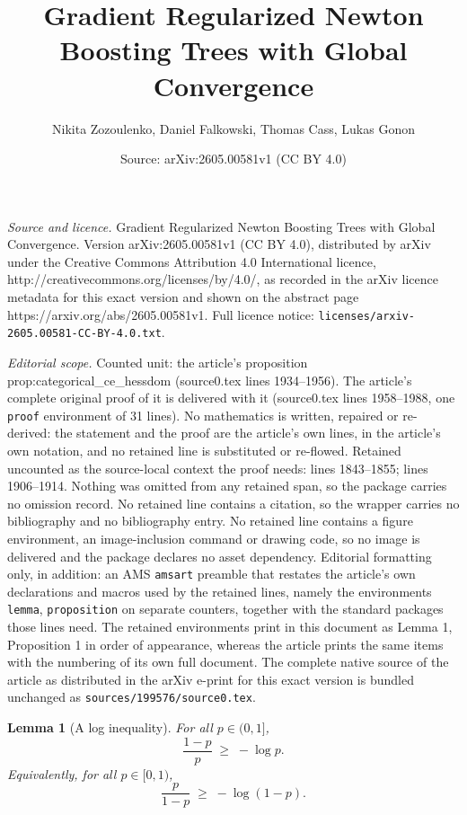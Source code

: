 \documentclass[10pt,a4paper]{amsart}
\title{Gradient Regularized Newton Boosting Trees with Global Convergence}
\author{Nikita Zozoulenko, Daniel Falkowski, Thomas Cass, Lukas Gonon}
\date{Source: arXiv:2605.00581v1 (CC BY 4.0)}
\newtheorem{lemma}{Lemma}
\begin{document}
\maketitle

\noindent\emph{Source and licence.} Gradient Regularized Newton Boosting Trees with Global Convergence. Version arXiv:2605.00581v1 (CC BY 4.0), distributed by arXiv under the Creative Commons Attribution 4.0 International licence, http://creativecommons.org/licenses/by/4.0/, as recorded in the arXiv licence metadata for this exact version and shown on the abstract page https://arxiv.org/abs/2605.00581v1. Full licence notice: \texttt{licenses/arxiv-2605.00581-CC-BY-4.0.txt}.\par\smallskip

\noindent\textit{Editorial scope.} Counted unit: the article's proposition prop:categorical\_ce\_hessdom (source0.tex lines 1934--1956). The article's complete original proof of it is delivered with it (source0.tex lines 1958--1988, one \texttt{proof} environment of 31 lines). No mathematics is written, repaired or re-derived: the statement and the proof are the article's own lines, in the article's own notation, and no retained line is substituted or re-flowed.  Retained uncounted as the source-local context the proof needs: lines 1843--1855; lines 1906--1914.  Nothing was omitted from any retained span, so the package carries no omission record.  No retained line contains a citation, so the wrapper carries no bibliography and no bibliography entry.  No retained line contains a figure environment, an image-inclusion command or drawing code, so no image is delivered and the package declares no asset dependency.  Editorial formatting only, in addition: an AMS \texttt{amsart} preamble that restates the article's own declarations and macros used by the retained lines, namely the environments \texttt{lemma}, \texttt{proposition} on separate counters, together with the standard packages those lines need.  The retained environments print in this document as Lemma 1, Proposition 1 in order of appearance, whereas the article prints the same items with the numbering of its own full document.  The complete native source of the article as distributed in the arXiv e-print for this exact version is bundled unchanged as \texttt{sources/199576/source0.tex}.
\begin{lemma}[A log inequality]
\label{lem:log_ineq}
For all $p\in(0,1]$,
\begin{equation}
\label{eq:log_ineq_1}
\frac{1-p}{p} \;\ge\; -\log p.
\end{equation}
Equivalently, for all $p\in[0,1)$,
\begin{equation}
\label{eq:log_ineq_2}
\frac{p}{1-p} \;\ge\; -\log(1-p).
\end{equation}
\end{lemma}
\end{document}
